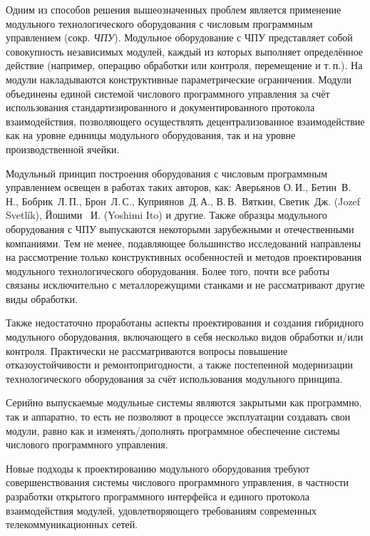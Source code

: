 Одним из способов решения вышеозначенных проблем является применение модульного технологического оборудования с числовым программным управлением (сокр. \textit{ЧПУ}). Модульное оборудование с ЧПУ представляет собой совокупность независимых модулей, каждый из которых выполняет определённое действие (например, операцию обработки или контроля, перемещение и т.\,п.). На модули накладываются конструктивные параметрические ограничения. Модули объединены единой системой числового программного управления за счёт использования стандартизированного и документированного протокола взаимодействия, позволяющего осуществлять децентрализованное взаимодействие как на уровне единицы модульного оборудования, так и на уровне производственной ячейки. 

Модульный принцип построения оборудования с числовым программным управлением освещен в работах таких авторов, как: Аверьянов О.\,И., Бетин~В.\,Н., Бобрик~Л.\,П., Брон~Л.\,С., Куприянов~Д.\,А., В.\,В.~Вяткин, Светик~Дж. (Jozef Svetl\'ik), Йошими ~И. (Yoshimi Ito) и другие. Также образцы модульного оборудования с ЧПУ выпускаются некоторыми зарубежными и отечественными компаниями. Тем не менее, подавляющее большинство исследований направлены на рассмотрение только конструктивных особенностей и методов проектирования модульного технологического оборудования. Более того, почти все работы связаны исключительно с металлорежущими станками и не рассматривают другие виды обработки.

Также недостаточно проработаны аспекты проектирования и создания гибридного модульного оборудования, включающего в себя несколько видов обработки и/или контроля. Практически не рассматриваются вопросы повышение отказоустойчивости и ремонтопригодности, а также постепенной модернизации технологического оборудования за счёт использования модульного принципа.

Серийно выпускаемые модульные системы являются закрытыми как программно, так и аппаратно, то есть не позволяют в процессе эксплуатации создавать свои модули, равно как и изменять/дополнять программное обеспечение системы числового программного управления. 

Новые подходы к проектированию модульного оборудования требуют совершенствования системы числового программного управления, в частности разработки открытого программного интерфейса и единого протокола взаимодействия модулей, удовлетворяющего требованиям современных телекоммуникационных сетей.

